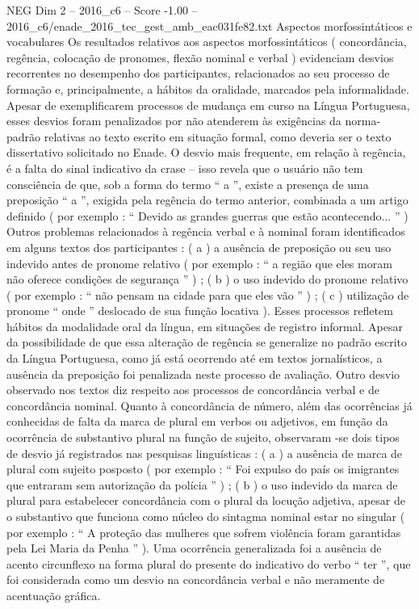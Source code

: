 \begin{textsample}{NEG Dim 2 – 2016\_c6 – Score -1.00 – 2016\_c6/enade\_2016\_tec\_gest\_amb\_eac031fe82.txt}
Aspectos morfossintáticos e vocabulares Os resultados relativos aos aspectos morfossintáticos ( concordância, regência, colocação de pronomes, flexão nominal e verbal ) evidenciam desvios recorrentes no desempenho dos participantes, relacionados ao seu processo de formação e, principalmente, a hábitos da oralidade, marcados pela informalidade.
Apesar de exemplificarem processos de mudança em curso na Língua Portuguesa, esses desvios foram penalizados por não atenderem às exigências da norma-padrão relativas ao texto escrito em situação formal, como deveria ser o texto dissertativo solicitado no Enade.
O desvio mais frequente, em relação à regência, é a falta do sinal indicativo da crase – isso revela que o usuário não tem consciência de que, sob a forma do termo “ a ”, existe a presença de uma preposição “ a ”, exigida pela regência do termo anterior, combinada a um artigo definido ( por exemplo : “ Devido as grandes guerras que estão acontecendo... ” ) Outros problemas relacionados à regência verbal e à nominal foram identificados em alguns textos dos participantes : ( a ) a ausência de preposição ou seu uso indevido antes de pronome relativo ( por exemplo : “ a região que eles moram não oferece condições de segurança ” ) ; ( b ) o uso indevido do pronome relativo ( por exemplo : “ não pensam na cidade para que eles vão ” ) ; ( c ) utilização de pronome “ onde ” deslocado de sua função locativa ).
Esses processos refletem hábitos da modalidade oral da língua, em situações de registro informal.
Apesar da possibilidade de que essa alteração de regência se generalize no padrão escrito da Língua Portuguesa, como já está ocorrendo até em textos jornalísticos, a ausência da preposição foi penalizada neste processo de avaliação.
Outro desvio observado nos textos diz respeito aos processos de concordância verbal e de concordância nominal.
Quanto à concordância de número, além das ocorrências já conhecidas de falta da marca de plural em verbos ou adjetivos, em função da ocorrência de substantivo plural na função de sujeito, observaram -se dois tipos de desvio já registrados nas pesquisas linguísticas : ( a ) a ausência de marca de plural com sujeito posposto ( por exemplo : “ Foi expulso do país os imigrantes que entraram sem autorização da polícia ” ) ; ( b ) o uso indevido da marca de plural para estabelecer concordância com o plural da locução adjetiva, apesar de o substantivo que funciona como núcleo do sintagma nominal estar no singular ( por exemplo : “ A proteção das mulheres que sofrem violência foram garantidas pela Lei Maria da Penha ” ).
Uma ocorrência generalizada foi a ausência de acento circunflexo na forma plural do presente do indicativo do verbo “ ter ”, que foi considerada como um desvio na concordância verbal e não meramente de acentuação gráfica.

\end{textsample}
